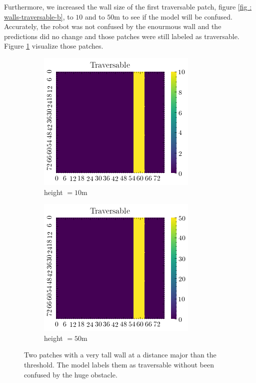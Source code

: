 \documentclass[../document.tex]{subfiles}
\begin{document}
Furthermore, we increased the wall size of the first traversable patch, figure \ref{fig : walls-traversable-b}, to $10$ and to $50$m to see if the model will be confused. Accurately, the robot was not confused by the enourmous wall and the predictions did no change and those patches were still labeled as traversable. Figure \ref{fig : walls-tall} visualize those patches.
\begin{figure}[htbp]
    \centering
    \begin{subfigure}[b]{0.33\textwidth}
        \includegraphics[width=\linewidth]{../img/5/custom_patches/walls_front/big-1-2d.png}
    \caption{height $=10$m}
    \end{subfigure}   
    \begin{subfigure}[b]{0.33\textwidth}
        \includegraphics[width=\linewidth]{../img/5/custom_patches/walls_front/big-2-2d.png}
        \caption{height $=50$m}
    \end{subfigure}   
\caption{Two patches with a very tall wall at a distance major than the threshold. The model labels them as traversable without been confused by the huge obstacle.}    
\label{fig : walls-tall}
\end{figure}
\end{document}
